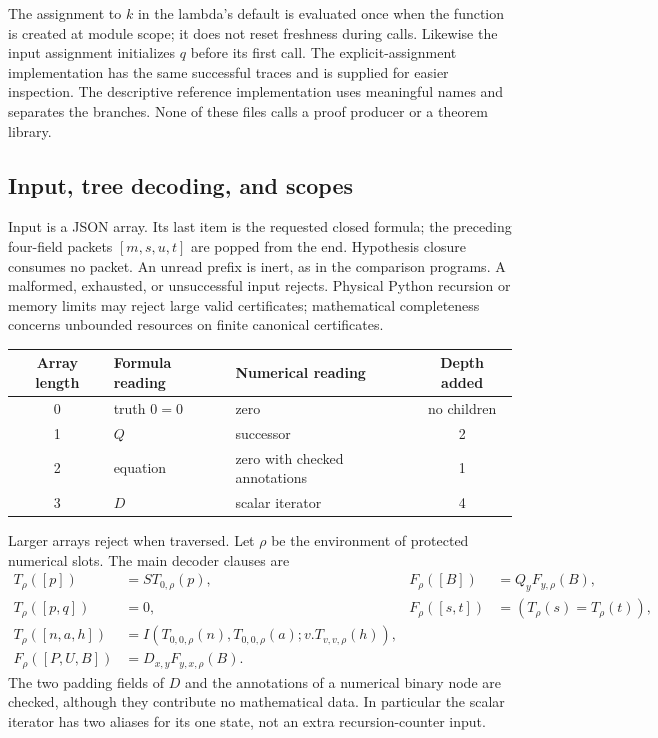 \documentclass[11pt,letterpaper]{article}
\theoremstyle{definition}\newtheorem{definition}[theorem]{Definition}
\theoremstyle{remark}\newtheorem{remark}[theorem]{Remark}
\begin{document}
The assignment to $k$ in the lambda's default is evaluated once when the
function is created at module scope; it does not reset freshness during
calls. Likewise the input assignment initializes $q$ before its first
call. The explicit-assignment implementation has the same successful
traces and is supplied for easier inspection. The descriptive reference
implementation uses meaningful names and separates the branches. None
of these files calls a proof producer or a theorem library.

\subsection{Input, tree decoding, and scopes}

Input is a JSON array. Its last item is the requested closed formula;
the preceding four-field packets $[m,s,u,t]$ are popped from the end.
Hypothesis closure consumes no packet. An unread prefix is inert, as in
the comparison programs. A malformed, exhausted, or unsuccessful input
rejects. Physical Python recursion or memory limits may reject large
valid certificates; mathematical completeness concerns unbounded
resources on finite canonical certificates.

\begin{center}\small
\begin{tabular}{cllc}
\toprule
Array length & Formula reading & Numerical reading & Depth added\\
\midrule
0 & truth $0=0$ & zero & no children\\
1 & $Q$ & successor &2\\
2 & equation & zero with checked annotations &1\\
3 & $D$ & scalar iterator &4\\
\bottomrule
\end{tabular}
\end{center}
Larger arrays reject when traversed. Let $\rho$ be the environment of
protected numerical slots. The main decoder clauses are
\begin{align*}
 T_\rho([p])&=S T_{0,\rho}(p),&
 F_\rho([B])&=Q_yF_{y,\rho}(B),\\
 T_\rho([p,q])&=0,&
 F_\rho([s,t])&=(T_\rho(s)=T_\rho(t)),\\
 T_\rho([n,a,h])&=I(T_{0,0,\rho}(n),T_{0,0,\rho}(a);
                         v.T_{v,v,\rho}(h)),\\
 F_\rho([P,U,B])&=D_{x,y}F_{y,x,\rho}(B).
\end{align*}
The two padding fields of $D$ and the annotations of a numerical binary
node are checked, although they contribute no mathematical data. In
particular the scalar iterator has two aliases for its one state, not
an extra recursion-counter input.
\end{document}
